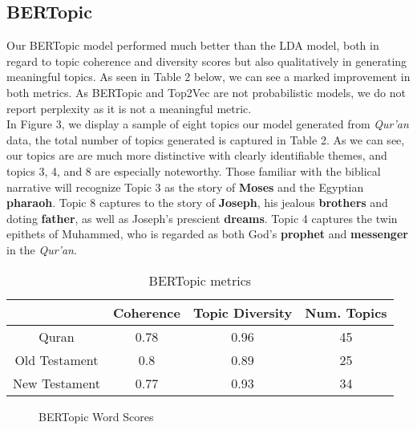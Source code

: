 \documentclass{article}
\begin{document}
\subsection{BERTopic}
    Our BERTopic model performed much better than the LDA model, both in regard to topic coherence and diversity scores but also qualitatively in generating meaningful topics. As seen in Table 2 below, we can see a marked improvement in both metrics. As BERTopic and Top2Vec are not probabilistic models, we do not report perplexity as it is not a meaningful metric. \\
    In Figure 3, we display a sample of eight topics our model generated from \textit{Qur'an} data, the total number of topics generated is captured in Table 2. As we can see, our topics are are much more distinctive with clearly identifiable themes, and topics 3, 4, and 8 are especially noteworthy. Those familiar with the biblical narrative will recognize Topic 3 as the story of \textbf{Moses} and the Egyptian \textbf{pharaoh}. Topic 8 captures to the story of \textbf{Joseph}, his jealous \textbf{brothers} and doting \textbf{father}, as well as Joseph's prescient \textbf{dreams}. Topic 4 captures the twin epithets of Muhammed, who is regarded as both God's \textbf{prophet} and \textbf{messenger} in the \textit{Qur'an}.  
    
    \begin{table}[H]
            \centering
            \begin{tabular}{|c|c|c|c|}
                \hline
                 & Coherence & Topic Diversity & Num. Topics\\
                \hline
                Quran & 0.78&0.96&45\\
                \hline 
                Old Testament & 0.8&0.89&25\\
                \hline
                New Testament & 0.77&0.93&34\\
                \hline 
            \end{tabular}
            \label{tab:my_label}
            \caption{BERTopic metrics}
        \end{table}
    
    \begin{figure}[H]
        \centering
        \caption{BERTopic Word Scores}
        \label{fig:enter-label}
    \end{figure}
\end{document}
